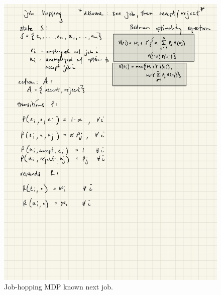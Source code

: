 \documentclass[12pt]{article}
\begin{document}
\begin{figure}[h]
	\centering
	\includegraphics[width=.5\textwidth]{ipad/q3_2.jpg}
	\caption{Job-hopping MDP known next job.}
	\label{fig:q3_2}
\end{figure}


\clearpage
\end{document}
